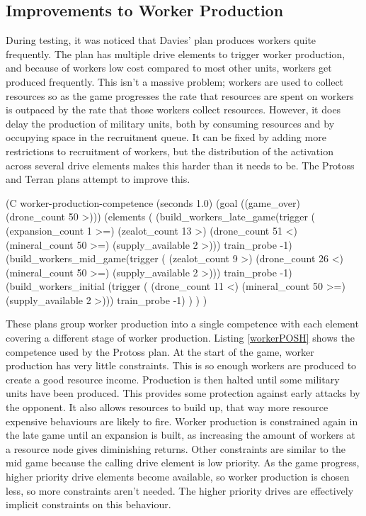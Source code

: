 \documentclass[11pt,openright,a4paper]{report}
\begin{document}
\subsection{Improvements to Worker Production}
\label{workerProd}
During testing, it was noticed that Davies' plan produces workers quite frequently. The plan has multiple drive elements to trigger worker production, and because of workers low cost compared to most other units, workers get produced frequently. This isn't a massive problem; workers are used to collect resources so as the game progresses the rate that resources are spent on workers is outpaced by the rate that those workers collect resources. However, it does delay the production of military units, both by consuming resources and by occupying space in the recruitment queue. It can be fixed by adding more restrictions to recruitment of workers, but the distribution of the activation across several drive elements makes this harder than it needs to be. The Protoss and Terran plans attempt to improve this.

\begin{Code}[frame=single,language=Lisp,tabsize=4,breaklines,breakatwhitespace,caption={A competence to control the production of worker units at different stages of the game.},label=workerPOSH]
(C worker-production-competence (seconds 1.0) (goal ((game_over) (drone_count 50 >)))
	(elements
		(
			(build_workers_late_game(trigger (
										(expansion_count 1 >=)
                                        (zealot_count 13 >)
										(drone_count 51 <)
										(mineral_count 50 >=)
										(supply_available 2 >)))
				train_probe -1)
			(build_workers_mid_game(trigger (
										(zealot_count 9 >)
										(drone_count 26 <)
										(mineral_count 50 >=)
										(supply_available 2 >)))
				train_probe -1)
			(build_workers_initial (trigger (
										(drone_count 11 <)
										(mineral_count 50 >=)
										(supply_available 2 >)))
				train_probe -1)
		)
	)
)
\end{Code}

These plans group worker production into a single competence with each element covering a different stage of worker production. Listing \ref{workerPOSH} shows the competence used by the Protoss plan. At the start of the game, worker production has very little constraints. This is so enough workers are produced to create a good resource income. Production is then halted until some military units have been produced. This provides some protection against early attacks by the opponent. It also allows resources to build up, that way more resource expensive behaviours are likely to fire. Worker production is constrained again in the late game until an expansion is built, as increasing the amount of workers at a resource node gives diminishing returns. Other constraints are similar to the mid game because the calling drive element is low priority. As the game progress, higher priority drive elements become available, so worker production is chosen less, so more constraints aren't needed. The higher priority drives are effectively implicit constraints on this behaviour.
\end{document}
